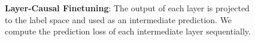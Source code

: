 \begin{figure}[h!]%
	\centering
	\caption{\textbf{Layer-Causal Finetuning}: The output of each layer is projected to the label space and used as an intermediate prediction.
		We compute the prediction loss of each intermediate layer sequentially.
	}
	\label{fig:layer_causal_diagram}
\end{figure}